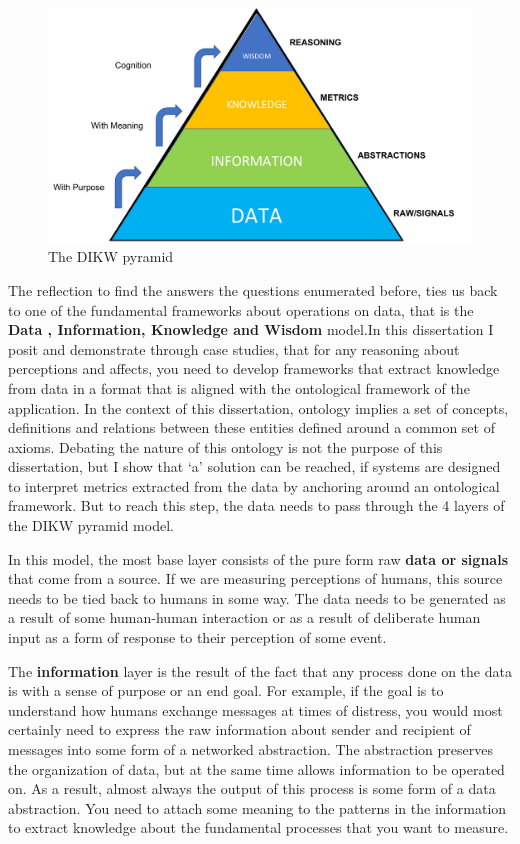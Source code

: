 \begin{figure}[t!]
    \centering
    \includegraphics[width=\columnwidth]{DIKW.pdf}
    \caption{The DIKW pyramid}
    \label{fig:dikw}
\end{figure}


The reflection to find the answers the questions enumerated before, ties us back to one of the fundamental frameworks about operations on data, that is the \textbf{Data , Information, Knowledge and Wisdom} model\cite{rowley2007wisdom}.In this dissertation I posit and demonstrate through case studies, that for any reasoning about perceptions and affects, you need to develop frameworks that extract knowledge from data in a format that is aligned with the ontological framework of the application. In the context of this dissertation, ontology implies a set of concepts, definitions and relations between these entities defined around a common set of axioms. Debating the nature of this ontology is not the purpose of this dissertation, but I show that `a' solution can be reached, if systems are designed to interpret metrics extracted from the data by anchoring around an ontological framework. But to reach this step, the data needs to pass through the 4 layers of the DIKW pyramid model.

In this model, the most base layer consists of the pure form raw \textbf{data or signals} that come from a source. If we are measuring perceptions of humans, this source needs to be tied back to humans in some way. The data needs to be generated as a result of some human-human interaction or as a result of deliberate human input as a form of response to their perception of some event. 

The \textbf{information} layer is the result of the fact that any process done on the data is with a sense of purpose or an end goal. For example, if the goal is to understand how humans exchange messages at times of distress, you would most certainly need to express the raw information about sender and recipient of messages into some form of a networked abstraction. The abstraction preserves the organization of data, but at the same time allows information to be operated on. As a result, almost always the output of this process is some form of a data abstraction. You need to attach some meaning to the patterns in the information to extract knowledge about the fundamental processes that you want to measure.

